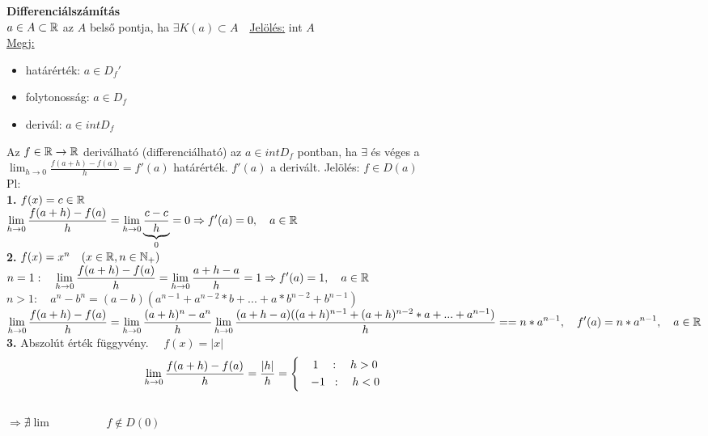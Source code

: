 \documentclass[a4paper,11pt]{article}
\begin{document}
\textbf{{\Large Differenciálszámítás}}\\[0.1cm]
 $a\in A\subset\mathbb{R}$ az $A$ belső pontja, ha $\exists K(a)\subset A\quad$\underline{Jelölés:} int $A$\\[0.1cm]\hspace*{0.3cm} \underline{Megj:}
\begin{itemize}
	\item határérték: $a\in D_f'$
	\item folytonosság: $a\in D_f$
	\item derivál: $a\in int D_f$
\end{itemize}
 Az $f\in\mathbb{R}\to\mathbb{R}$ deriválható (differenciálható) az $a\in int D_f$ pontban, ha $\exists$ és véges a\\[0.1cm]$\displaystyle\lim_{h\to0}\frac{f(a+h)-f(a)}{h}=f'(a)$ határérték.\hspace{1.5cm} $f'(a)$ a derivált.\hspace{1cm} Jelölés: $f\in D(a)$\\[0.1cm]Pl:\\[0.1cm] \textbf{1.} $f(x)=c\in\mathbb{R}$\\[0.1cm] $\displaystyle\lim_{h\to0}\frac{f(a+h)-f(a)}{h}=\displaystyle\lim_{h\to0}\underbrace{\frac{c-c}{h}}_{0}=0\Rightarrow f'(a)=0,\quad a\in\mathbb{R}$\\[0.1cm]\textbf{2.} $f(x)=x^n\quad(x\in\mathbb{R},n\in\mathbb{N}_+)$\\[0.1cm]$n=1:\quad\displaystyle\lim_{h\to0} \frac{f(a+h)-f(a)}{h}=\displaystyle\lim_{h\to0} \frac{a+h-a}{h}=1\Rightarrow f'(a)=1,\quad a\in\mathbb{R}$\\[0.1cm]$n>1:\quad a^n-b^n=(a-b) (a^{n-1}+a^{n-2}*b+...+a*b^{n-2}+b^{n-1})$\\[0.1cm]$\displaystyle\lim_{h\to0}\frac{f(a+h)-f(a)}{h}=\displaystyle\lim_{h\to0}\frac{(a+h)^n-a^n}{h}\displaystyle\lim_{h\to0}\frac{(a+h-a)((a+h)^{n-1}+(a+h)^{n-2}*a+...+a^{n-1})}{h}=\\[0.1cm]=n*a^{n-1}, \quad f'(a)=n*a^{n-1},\quad a\in\mathbb{R}$\\[0.3cm]\textbf{3.} Abszolút érték függyvény.  $\quad f(x)=|x|$\\[0.3cm]
\[\displaystyle \displaystyle\lim_{h\to0}\frac{f(a+h)-f(a)}{h}=\frac{|h|}{h} = 
\left\{
\begin{gathered}
\quad 1\quad: \quad h>0\hspace{5.7cm} \\
\quad -1\hspace{0.2cm}:\quad h<0\hspace{5.7cm}
\end{gathered}\right. \]\\[0.2cm]
$\Rightarrow\nexists\lim\hspace{2cm}f\notin D(0)$
\end{document}
